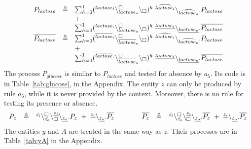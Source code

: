 \[
\begin{array}{lcllcl}
P_{lactose} &\defeq &%
\sum_{h=0}^1 (\startchain{lactose_i}\chainedlink{lactose_o}{\noact}\chainend{\noact})^h\ \link{\widehat{lactose_i}}{\widehat{lactose_o}}.P_{lactose}
\\
&& + \\
&& \sum_{h=0}^1 (\startchain{lactose_i}\chainedlink{lactose_o}{\noact}\chainend{\noact})^h\ \link{\underline{lactose_i}}{\underline{lactose_o}}.\overline{P_{lactose}}\\
%

\overline{P_{lactose}} &\defeq &\sum_{h=0}^1 (\startchain{\overline{lactose}_i}\chainedlink{\overline{lactose}_o}{\noact}\chainend{\noact})^h\ \link{\widehat{lactose_i}}{\widehat{lactose_o}}.P_{lactose}\\
&&+\\
&& \sum_{h=0}^1 (\startchain{\overline{lactose}_i}\chainedlink{\overline{lactose}_o}{\noact}\chainend{\noact})^h\ \link{\underline{lactose_i}}{\underline{lactose_o}}.\overline{P_{lactose}}\\
\end{array}
\]
\noindent
The  process $P_{glucose}$ is similar to $P_{lactose}$ and tested for absence by $a_5$. Its code is  in Table~\ref{tab:glucose}, in the Appendix.
The entity $z$ can only be produced by rule $a_6$, while it is never provided by the context. Moreover, there is no rule for testing its presence or absence.
\[
\begin{array}{lcl@{\qquad\qquad}lcl}
P_z&\defeq &\startchain{\tilde{z_i}}\chainedlink{\tilde{z_o}}{\noact}\chainedlink{\noact}{\underline{z_i}}\chainend{\underline{z_o}}.P_z\ + \
\link{\underline{z_i}}{\underline{z_o}}.\overline{P_z}
&
\overline{P_z} &\defeq &\startchain{\tilde{z_i}}\chainedlink{\tilde{z_o}}{\noact}\chainedlink{\noact}{\underline{z_i}}\chainend{\underline{z_o}}.\overline{P_z}\ + \
\link{\underline{z_i}}{\underline{z_o}}.\overline{P_z}\\\end{array}
\]
\noindent
The entities $y$ and $A$ are treated in the same way as $z$. Their processes are in Table~\ref{tab:yA} in the Appendix.



